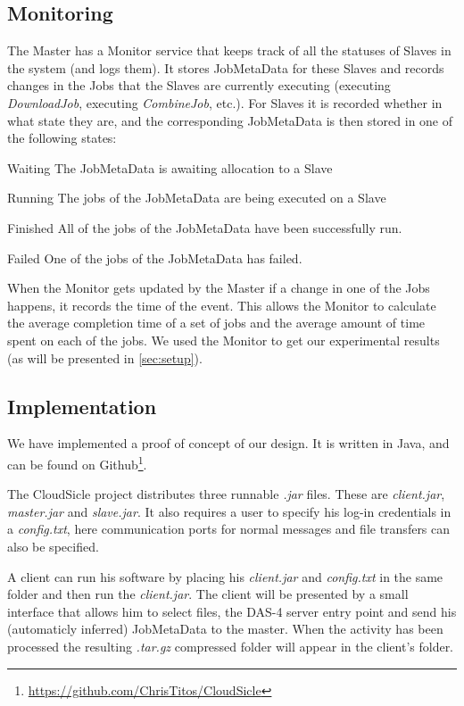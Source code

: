 \documentclass[twocolumn,twoside]{IEEEtran}
\begin{document}
\subsection{Monitoring}
The Master has a Monitor service that keeps track of all the statuses of Slaves in the system (and logs them).
It stores JobMetaData for these Slaves and records changes in the Jobs that the Slaves
are currently executing (executing \emph{DownloadJob}, executing \emph{CombineJob}, etc.). 
For Slaves it is recorded whether in what state they are, and the corresponding JobMetaData
is then stored in one of the following states:
\begin{LaTeXdescription}
\item[Waiting] The JobMetaData is awaiting allocation to a Slave
\item[Running] The jobs of the JobMetaData are being executed on a Slave
\item[Finished] All of the jobs of the JobMetaData have been successfully run.
\item[Failed] One of the jobs of the JobMetaData has failed.
\end{LaTeXdescription}
When the Monitor gets updated by the Master if a change in one of the Jobs happens,
it records the time of the event. This allows the Monitor to calculate the
average completion time of a set of jobs and the average amount of time spent
on each of the jobs.
We used the Monitor to get our experimental results (as will be presented in \autoref{sec:setup}).

\subsection{Implementation}
We have implemented a proof of concept of our design. It is written in Java, and can be found on Github\footnote{\url{https://github.com/ChrisTitos/CloudSicle}}.

The CloudSicle project distributes three runnable \emph{.jar} files.
These are \emph{client.jar}, \emph{master.jar} and \emph{slave.jar}.
It also requires a user to specify his log-in credentials in a \emph{config.txt},
here communication ports for normal messages and file transfers can also
be specified.

A client can run his software by placing his \emph{client.jar} and \emph{config.txt}
in the same folder and then run the \emph{client.jar}. The client will
be presented by a small interface that allows him to select files, the DAS-4
server entry point and send his (automaticly inferred) JobMetaData to the master.
When the activity has been processed the resulting \emph{.tar.gz} compressed
folder will appear in the client's folder.
\end{document}

